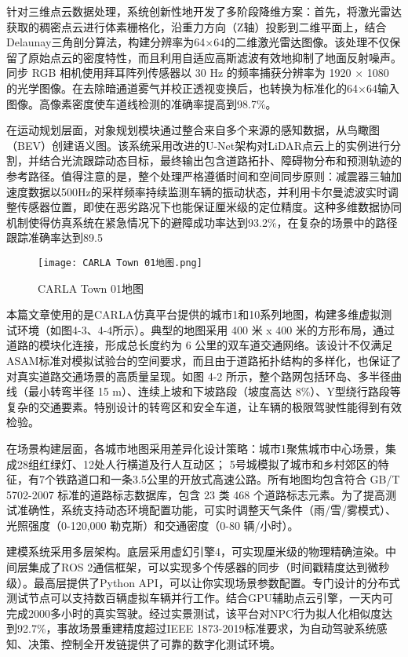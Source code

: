 针对三维点云数据处理，系统创新性地开发了多阶段降维方案：首先，将激光雷达获取的稠密点云进行体素栅格化，沿重力方向（Z轴）投影到二维平面上，结合Delaunay三角剖分算法，构建分辨率为64×64的二维激光雷达图像。该处理不仅保留了原始点云的密度特性，而且利用自适应高斯滤波有效地抑制了地面反射噪声。同步 RGB 相机使用拜耳阵列传感器以 30 Hz 的频率捕获分辨率为 1920 × 1080 的光学图像。在去除暗通道雾气并校正透视变换后，也转换为标准化的64×64输入图像。高像素密度使车道线检测的准确率提高到98.7\%。

在运动规划层面，对象规划模块通过整合来自多个来源的感知数据，从鸟瞰图（BEV）创建语义图。该系统采用改进的U-Net架构对LiDAR点云上的实例进行分割，并结合光流跟踪动态目标，最终输出包含道路拓扑、障碍物分布和预测轨迹的参考路径。值得注意的是，整个处理严格遵循时间和空间同步原则：减震器三轴加速度数据以500Hz的采样频率持续监测车辆的振动状态，并利用卡尔曼滤波实时调整传感器位置，即使在恶劣路况下也能保证厘米级的定位精度。这种多维数据协同机制使得仿真系统在紧急情况下的避障成功率达到93.2\%，在复杂的场景中的路径跟踪准确率达到89.5%

\begin{figure}[hbt]
	\centering
	\texttt{[image: CARLA Town 01地图.png]}
	\caption{CARLA Town 01地图}
	\label{f.example}
\end{figure}

本篇文章使用的是CARLA仿真平台提供的城市1和10系列地图，构建多维虚拟测试环境（如图4-3、4-4所示）。典型的地图采用 400 米 x 400 米的方形布局，通过道路的模块化连接，形成总长度约为 6 公里的双车道交通网络。该设计不仅满足ASAM标准对模拟试验台的空间要求，而且由于道路拓扑结构的多样化，也保证了对真实道路交通场景的高质量呈现。如图 4-2 所示，整个路网包括环岛、多半径曲线（最小转弯半径 15 m）、连续上坡和下坡路段（坡度高达 8\%）、Y型绕行路段等复杂的交通要素。特别设计的转弯区和安全车道，让车辆的极限驾驶性能得到有效检验。

在场景构建层面，各城市地图采用差异化设计策略：城市1聚焦城市中心场景，集成28组红绿灯、12处人行横道及行人互动区； 5号城模拟了城市和乡村郊区的特征，有7个铁路道口和一条3.5公里的开放式高速公路。所有地图均包含符合 GB/T 5702-2007 标准的道路标志数据库，包含 23 类 468 个道路标志元素。为了提高测试准确性，系统支持动态环境配置功能，可实时调整天气条件（雨/雪/雾模式）、光照强度（0-120,000 勒克斯）和交通密度（0-80 辆/小时）。

建模系统采用多层架构。底层采用虚幻引擎4，可实现厘米级的物理精确渲染。中间层集成了ROS 2通信框架，可以实现多个传感器的同步（时间戳精度达到微秒级）。最高层提供了Python API，可以让你实现场景参数配置。专门设计的分布式测试节点可以支持数百辆虚拟车辆并行工作。结合GPU辅助点云引擎，一天内可完成2000多小时的真实驾驶。经过实景测试，该平台对NPC行为拟人化相似度达到92.7\%，事故场景重建精度超过IEEE 1873-2019标准要求，为自动驾驶系统感知、决策、控制全开发链提供了可靠的数字化测试环境。

